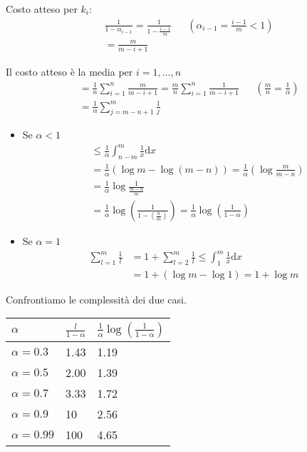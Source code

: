 Costo atteso per $k_i$:
\begin{align*}
	& \frac{1}{1-\alpha_{i-1}} = \frac{1}{1-\frac{i-1}{m}} && \left(\alpha_{i-1} = \frac{i-1}{m} < 1\right) \\
	& = \frac{m}{m-i+1}
\end{align*}

Il costo atteso è la media per $i = 1,\dots,n$
\begin{align*}
    & = \frac{1}{n} \displaystyle\sum_{i=1}^{n} \frac{m}{m-i+1}
		= \frac{m}{n}\displaystyle\sum_{i=1}^{n} \frac{1}{m-i+1} && \left(\frac{m}{n} = \frac{1}{\alpha}\right)\\
    & = \frac{1}{\alpha} \displaystyle\sum_{j=m-n+1}^{m}\frac{1}{j}
\end{align*}

\begin{itemize}
    \item Se $\alpha < 1$ %
    \begin{align*}
        & \leq \frac{1}{\alpha} \int_{n-m}^{m}\frac{1}{x} \mathrm{d}x \\ 
        & = \frac{1}{\alpha}\left( \log m - \log (m-n) \right) = \frac{1}{\alpha}\left( \log \frac{m}{m-n} \right) \\
        & = \frac{1}{\alpha} \log \frac{1}{\frac{m-n}{m}} \\ 
        & = \frac{1}{\alpha} \log \left( \frac{1}{1-\left( \frac{n}{m} \right)} \right)
            = \frac{1}{\alpha} \log \left( \frac{1}{1-\alpha } \right)
    \end{align*}

    \item Se $\alpha = 1$
    \begin{align*}
        \displaystyle\sum_{l = 1}^{m} \frac{1}{l} & = 1 + \displaystyle\sum_{l=2}^m \frac{1}{l} 
            \leq \int_1^m \frac{1}{x} \mathrm{d}x \\
        & = 1 + \left( \log m - \log 1 \right) = 1 + \log m
    \end{align*}
\end{itemize}

Confrontiamo le complessità dei due casi.

\begin{center}
    \begin{tabular}{l|l|l}
        $\alpha$ & $\frac{l}{1-\alpha}$ & $\frac{1}{\alpha} \log \left( \frac{1}{1-\alpha} \right)$ \\
        \hline
        $\alpha = 0.3$  & 1.43 & 1.19 \\
        $\alpha = 0.5$  & 2.00 & 1.39 \\
        $\alpha = 0.7$  & 3.33 & 1.72 \\
        $\alpha = 0.9$  & 10 & 2.56 \\
        $\alpha = 0.99$ & 100 & 4.65         
    \end{tabular}
\end{center}
